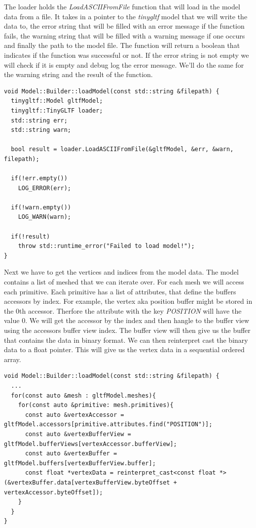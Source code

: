 \documentclass[12pt]{report} \usepackage{preamble}
\begin{document}
The loader holds the \textit{LoadASCIIFromFile} function that will load in the model data from a file. It takes in a pointer to the \textit{tinygltf} model
that we will write the data to, the error string that will be filled with an error message if the function fails, the warning string that will be filled with a warning message if one occurs
and finally the path to the model file. The function will return a boolean that indicates if the function was successful or not. If the error string is not empty
we will check if it is empty and debug log the error message. We'll do the same for the warning string and the result of the function.

\begin{lstlisting}[Language=C++]
void Model::Builder::loadModel(const std::string &filepath) {
  tinygltf::Model gltfModel;
  tinygltf::TinyGLTF loader;
  std::string err;
  std::string warn;

  bool result = loader.LoadASCIIFromFile(&gltfModel, &err, &warn, filepath);

  if(!err.empty())
    LOG_ERROR(err);

  if(!warn.empty())
    LOG_WARN(warn);

  if(!result)
    throw std::runtime_error("Failed to load model!");
}
\end{lstlisting}

Next we have to get the vertices and indices from the model data. The model contains a list of meshed that we can iterate over. For each mesh we will access each primitive.
Each primitive has a list of attributes, that define the buffers accessors by index. For example, the vertex aka position buffer might be stored in the 0th accessor. Therfore
the attribute with the key \textit{POSITION} will have the value 0. We will get the accessor by the index and then hangle to the buffer view using the accessors buffer view index.
The buffer view will then give us the buffer that contains the data in binary format. We can then reinterpret cast the binary data to a float pointer. This will give us the vertex data
in a sequential ordered array.

\begin{lstlisting}[Language=C++]
void Model::Builder::loadModel(const std::string &filepath) {
  ...
  for(const auto &mesh : gltfModel.meshes){
    for(const auto &primitive: mesh.primitives){
      const auto &vertexAccessor = gltfModel.accessors[primitive.attributes.find("POSITION")];
      const auto &vertexBufferView = gltfModel.bufferViews[vertexAccessor.bufferView];
      const auto &vertexBuffer = gltfModel.buffers[vertexBufferView.buffer];
      const float *vertexData = reinterpret_cast<const float *>(&vertexBuffer.data[vertexBufferView.byteOffset + vertexAccessor.byteOffset]);
    }
  }
}
\end{lstlisting}
\end{document}
